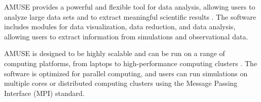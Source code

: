 AMUSE provides a powerful and flexible tool for data analysis, allowing users to analyze large data sets and to extract meaningful scientific results \citep{portegies2018astrophysical}. The software includes modules for data visualization, data reduction, and data analysis, allowing users to extract information from simulations and observational data.

AMUSE is designed to be highly scalable and can be run on a range of computing platforms, from laptops to high-performance computing clusters \citep{pelupessy2013astrophysical}. The software is optimized for parallel computing, and users can run simulations on multiple cores or distributed computing clusters using the Message Passing Interface (MPI) standard.


